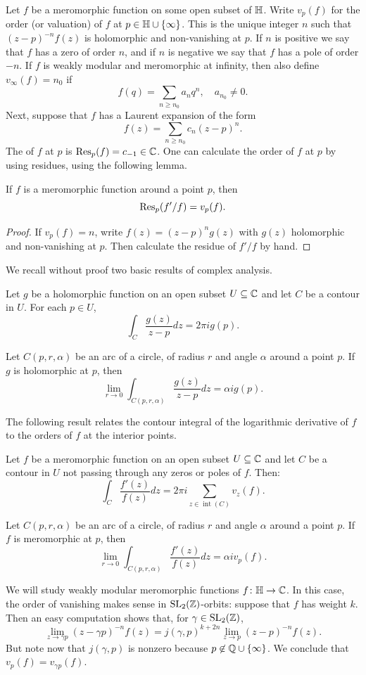 Let $f$ be a meromorphic function on some open subset of $\mathbb{H}$. Write $v_p(f)$ for the order (or valuation) of $f$ at $p\in \mathbb{H}\cup\{\infty\}$. This is the unique integer
$n$ such that $(z-p)^{-n}f(z)$ is holomorphic and non-vanishing at $p$. If $n$ is positive we
say that $f$ has a zero of order $n$, and if $n$ is negative we say that $f$ has a pole of order $-n$. If $f$ is weakly modular and meromorphic at infinity, then also define $v_\infty(f)=n_0$ if
\[
f(q)=\sum_{n\geq n_0} a_n q^n,\quad a_{n_0}\neq 0.
\]
Next, suppose that $f$ has a Laurent expansion of the form
\[
f(z) = \sum_{n\geq n_0} c_n (z-p)^n.
\]
The  of $f$ at $p$ is $\operatorname{Res}_p(f) = c_{-1}\in\mathbb{C}$. One can calculate
the order of $f$ at $p$ by using residues, using the following lemma.
\begin{lemma} If $f$ is a meromorphic function around a point $p$, then
  \[
\operatorname{Res}_p(f'/f) = v_p(f).
\]
\end{lemma}
\begin{proof}
If $v_p(f)=n$, write $f(z)=(z-p)^ng(z)$ with $g(z)$ holomorphic and non-vanishing at $p$. Then calculate the residue of $f'/f$ by hand.
\end{proof}
We recall without proof two basic results of complex analysis.
\begin{theorem}
  Let $g$ be a holomorphic function on an open subset $U\subseteq\mathbb{C}$ and let $C$ be a contour in $U$. For each $p\in U$,
\[
\int_C \frac{g(z)}{z-p}dz = 2\pi i g(p).
\]
\end{theorem}
\begin{corollary}
  Let $C(p,r,\alpha)$ be an arc of a circle, of radius $r$ and angle $\alpha$ around a point $p$. If $g$ is holomorphic at $p$, then
\[
\lim_{r\to 0}\int_{C(p,r,\alpha)} \frac{g(z)}{z-p}dz = \alpha i g(p).
\]
\end{corollary}
The following result relates the contour integral of the logarithmic derivative of $f$ to the orders of $f$ at the interior points.
\begin{theorem}
  Let $f$ be a meromorphic function on an open subset $U\subseteq \mathbb{C}$ and let $C$ be a contour in $U$ not passing through any zeros or poles of $f$. Then:
\[
\int_C\frac{f'(z)}{f(z)}dz = 2\pi i \sum_{z\in\operatorname{int}(C)} v_z(f).
\]
\end{theorem}

\begin{corollary}
  Let $C(p,r,\alpha)$ be an arc of a circle, of radius $r$ and angle $\alpha$ around a point $p$. If $f$ is meromorphic at $p$, then
\[
\lim_{r\to 0}\int_{C(p,r,\alpha)} \frac{f'(z)}{f(z)}dz = \alpha i v_p(f).
\]
\end{corollary}
We will study weakly modular meromorphic functions $f\colon \mathbb{H}\to \mathbb{C}$. In this case, the order of vanishing makes sense in $\operatorname{SL}_2(\mathbb{Z})$-orbits: suppose that $f$ has weight $k$. Then an easy computation shows that, for $\gamma\in\operatorname{SL}_2(\mathbb{Z})$,
\[
\lim_{z\to\gamma p} (z-\gamma p)^{-n}f(z) = j(\gamma,p)^{k+2n}\lim_{z\to p} (z-p)^{-n}f(z).
\]
But note now that $j(\gamma,p)$ is nonzero because $p\not\in \mathbb{Q}\cup\{\infty\}$. We conclude that $v_p(f)=v_{\gamma p}(f)$.


